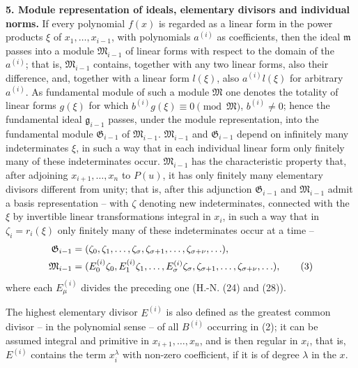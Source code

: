 \documentclass[11pt]{article}
\providecommand{\frakM}{\mathfrak M}
\providecommand{\frakG}{\mathfrak G}
\providecommand{\frakm}{\mathfrak m}
\providecommand{\frakg}{\mathfrak g}
\begin{document}
\textbf{5. Module representation of ideals, elementary divisors and individual norms.} If every polynomial $f(x)$ is regarded as a linear form in the power products $\xi$ of $x_1,\ldots,x_{i-1}$, with polynomials $a^{(i)}$ as coefficients, then the ideal $\frakm$ passes into a module $\frakM_{i-1}$ of linear forms with respect to the domain of the $a^{(i)}$; that is, $\frakM_{i-1}$ contains, together with any two linear forms, also their difference, and, together with a linear form $l(\xi)$, also $a^{(i)}l(\xi)$ for arbitrary $a^{(i)}$. As fundamental module of such a module $\frakM$ one denotes the totality of linear forms $g(\xi)$ for which $b^{(i)}g(\xi)\equiv0\pmod{\frakM}$, $b^{(i)}\ne0$; hence the fundamental ideal $\frakg_{i-1}$ passes, under the module representation, into the fundamental module $\frakG_{i-1}$ of $\frakM_{i-1}$. $\frakM_{i-1}$ and $\frakG_{i-1}$ depend on infinitely many indeterminates $\xi$, in such a way that in each individual linear form only finitely many of these indeterminates occur. $\frakM_{i-1}$ has the characteristic property that, after adjoining $x_{i+1},\ldots,x_n$ to $P(u)$, it has only finitely many elementary divisors different from unity; that is, after this adjunction $\frakG_{i-1}$ and $\frakM_{i-1}$ admit a basis representation -- with $\zeta$ denoting new indeterminates, connected with the $\xi$ by invertible linear transformations integral in $x_i$, in such a way that in $\zeta_i=r_i(\xi)$ only finitely many of these indeterminates occur at a time --
\begin{align}
\frakG_{i-1}&=(\zeta_0,\zeta_1,\ldots,\zeta_\sigma,\zeta_{\sigma+1},\ldots,\zeta_{\sigma+\nu},\ldots), \notag\\
\frakM_{i-1}&=(E_0^{(i)}\zeta_0,E_1^{(i)}\zeta_1,\ldots,E_\sigma^{(i)}\zeta_\sigma,
\zeta_{\sigma+1},\ldots,\zeta_{\sigma+\nu},\ldots), \tag{3}
\end{align}
where each $E_\mu^{(i)}$ divides the preceding one (H.-N. (24) and (28)).

The highest elementary divisor $E^{(i)}$ is also defined as the greatest common divisor -- in the polynomial sense -- of all $B^{(i)}$ occurring in (2); it can be assumed integral and primitive in $x_{i+1},\ldots,x_n$, and is then regular in $x_i$, that is, $E^{(i)}$ contains the term $x_i^\lambda$ with non-zero coefficient, if it is of degree $\lambda$ in the $x$.
\end{document}
